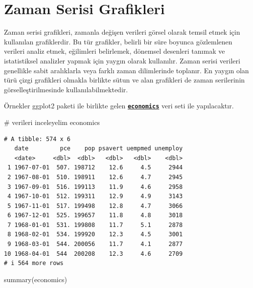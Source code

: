 \documentclass[
  letterpaper,
  DIV=11,
  numbers=noendperiod]{scrreprt}
\newenvironment{Shaded}{\begin{snugshade}}{\end{snugshade}}
\newcommand{\CommentTok}[1]{\textcolor[rgb]{0.37,0.37,0.37}{#1}}
\newcommand{\FunctionTok}[1]{\textcolor[rgb]{0.28,0.35,0.67}{#1}}
\newcommand{\NormalTok}[1]{\textcolor[rgb]{0.00,0.23,0.31}{#1}}
\begin{document}
\section*{Zaman Serisi Grafikleri}\label{zaman-serisi-grafikleri}


Zaman serisi grafikleri, zamanla değişen verileri görsel olarak temsil
etmek için kullanılan grafiklerdir. Bu tür grafikler, belirli bir süre
boyunca gözlemlenen verileri analiz etmek, eğilimleri belirlemek,
dönemsel desenleri tanımak ve istatistiksel analizler yapmak için yaygın
olarak kullanılır. Zaman serisi verileri genellikle sabit aralıklarla
veya farklı zaman dilimlerinde toplanır. En yaygın olan türü çizgi
grafikleri olmakla birlikte sütun ve alan grafikleri de zaman
serilerinin görselleştirilmesinde kullanılabilmektedir.

Örnekler ggplot2 paketi ile birlikte gelen
\href{https://ggplot2.tidyverse.org/reference/economics.html}{\textbf{\texttt{economics}}}
veri seti ile yapılacaktır.

\begin{Shaded}
\begin{Highlighting}[]
\CommentTok{\# verileri inceleyelim}
\NormalTok{economics}
\end{Highlighting}
\end{Shaded}

\begin{verbatim}
# A tibble: 574 x 6
   date         pce    pop psavert uempmed unemploy
   <date>     <dbl>  <dbl>   <dbl>   <dbl>    <dbl>
 1 1967-07-01  507. 198712    12.6     4.5     2944
 2 1967-08-01  510. 198911    12.6     4.7     2945
 3 1967-09-01  516. 199113    11.9     4.6     2958
 4 1967-10-01  512. 199311    12.9     4.9     3143
 5 1967-11-01  517. 199498    12.8     4.7     3066
 6 1967-12-01  525. 199657    11.8     4.8     3018
 7 1968-01-01  531. 199808    11.7     5.1     2878
 8 1968-02-01  534. 199920    12.3     4.5     3001
 9 1968-03-01  544. 200056    11.7     4.1     2877
10 1968-04-01  544  200208    12.3     4.6     2709
# i 564 more rows
\end{verbatim}

\begin{Shaded}
\begin{Highlighting}[]
\FunctionTok{summary}\NormalTok{(economics)}
\end{Highlighting}
\end{Shaded}
\end{document}
